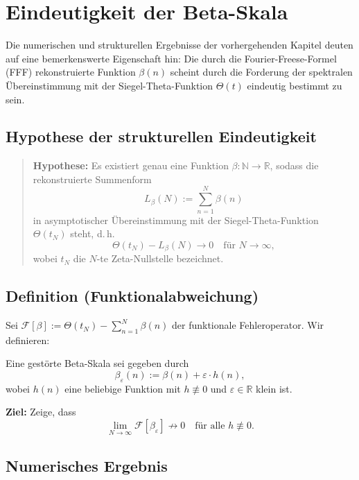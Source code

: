 \section{Eindeutigkeit der Beta-Skala}

Die numerischen und strukturellen Ergebnisse der vorhergehenden Kapitel deuten auf eine bemerkenswerte Eigenschaft hin: Die durch die Fourier-Freese-Formel (FFF) rekonstruierte Funktion \(\beta(n)\) scheint durch die Forderung der spektralen Übereinstimmung mit der Siegel-Theta-Funktion \(\Theta(t)\) eindeutig bestimmt zu sein.

\subsection{Hypothese der strukturellen Eindeutigkeit}

\begin{quote}
\textbf{Hypothese:} Es existiert genau eine Funktion \(\beta : \mathbb{N} \to \mathbb{R}\), sodass die rekonstruierte Summenform
\[
L_{\beta}(N) := \sum_{n=1}^{N} \beta(n)
\]
in asymptotischer Übereinstimmung mit der Siegel-Theta-Funktion \(\Theta(t_N)\) steht, d.\,h.
\[
\Theta(t_N) - L_{\beta}(N) \to 0 \quad \text{für } N \to \infty,
\]
wobei \(t_N\) die \(N\)-te Zeta-Nullstelle bezeichnet.
\end{quote}

\subsection{Definition (Funktionalabweichung)}

Sei \(\mathcal{F}[\beta] := \Theta(t_N) - \sum_{n=1}^{N} \beta(n)\) der funktionale Fehleroperator. Wir definieren:

\begin{definition}
Eine gestörte Beta-Skala sei gegeben durch
\[
\beta_\varepsilon(n) := \beta(n) + \varepsilon \cdot h(n),
\]
wobei \(h(n)\) eine beliebige Funktion mit \(h \not\equiv 0\) und \(\varepsilon \in \mathbb{R}\) klein ist.
\end{definition}

\textbf{Ziel:} Zeige, dass
\[
\lim_{N \to \infty} \mathcal{F}[\beta_\varepsilon] \not\to 0
\quad \text{für alle } h \not\equiv 0.
\]

\subsection{Numerisches Ergebnis}

